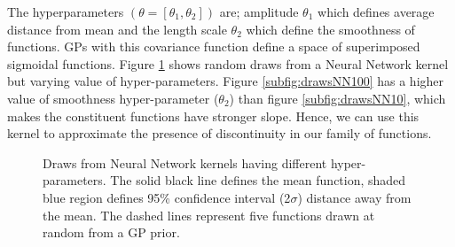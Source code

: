 The hyperparameters $(\theta = [\theta_{1}, \theta_{2}])$ are; amplitude $\theta_{1}$ which defines average distance from mean and the length scale $\theta_{2}$ which define the smoothness of functions. GPs with this covariance function define a space of superimposed sigmoidal functions. Figure \ref{figNNPrior} shows random draws from a Neural Network kernel but varying value of hyper-parameters. Figure \ref{subfig:drawsNN100} has a higher value of smoothness hyper-parameter ($\theta_{2}$) than figure \ref{subfig:drawsNN10}, which makes the constituent functions have stronger slope. Hence, we can use this kernel to approximate the presence of discontinuity in our family of functions. 

\begin{figure}[!ht]
  \centering
  \quad
    \quad
  \caption{Draws from Neural Network kernels having different hyper-parameters. The solid black line defines the mean function, shaded blue region defines 95\% confidence interval (2$\sigma$) distance away from the mean. The dashed lines represent five functions drawn at random from a GP prior.}
  \label{figNNPrior}
\end{figure}


